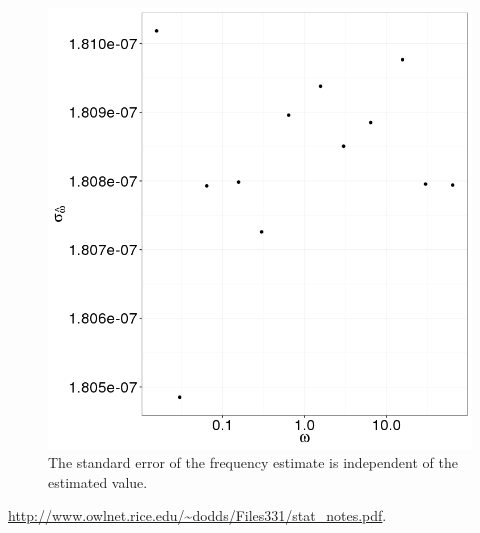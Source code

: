 \documentclass{article}
\begin{document}
\begin{figure}[h]
	\centering
	\includegraphics[scale=.8]{img/StatReq/SEw_vs_w}
	\caption{The standard error of the frequency estimate is independent of the estimated value.\label{fig:SEw_vs_w}}
\end{figure}

\begin{thebibliography}{9}
	\url{http://www.owlnet.rice.edu/~dodds/Files331/stat_notes.pdf}.
\end{thebibliography}
\end{document}
